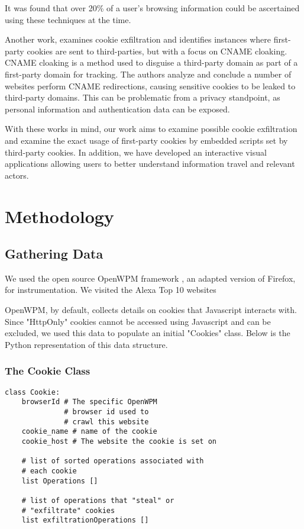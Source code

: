 \documentclass[sigplan,screen]{acmart}
\begin{document}
It was found that over 20\% of a user's browsing information could be ascertained using these techniques at the time. 

Another work, \cite{ren2021analysis} examines cookie exfiltration and identifies instances where first-party cookies are sent to third-parties, but with a focus on CNAME cloaking. CNAME cloaking is a method used to disguise a third-party domain as part of a first-party domain for tracking. The authors analyze and conclude a number of websites perform CNAME redirections, causing sensitive cookies to be leaked to third-party domains. This can be problematic from a privacy standpoint, as personal information and authentication data can be exposed. 

With these works in mind, our work aims to examine possible cookie exfiltration and examine the exact usage of first-party cookies by embedded scripts set by third-party cookies. In addition, we have developed an interactive visual applications allowing users to better understand information travel and relevant actors.

\section{Methodology}


\subsection{Gathering Data}

We used the open source OpenWPM framework \cite{englehardt2016census}, an adapted version of Firefox, for instrumentation. We visited the Alexa Top 10 websites \cite{alexa}

OpenWPM, by default, collects details on cookies that Javascript interacts with. Since "HttpOnly" cookies cannot be accessed using Javascript and can be excluded, we used this data  to populate an initial "Cookies" class.
Below is the Python representation of this data structure.

\subsubsection{The Cookie Class}

\begin{verbatim}
class Cookie: 
    browserId # The specific OpenWPM 
              # browser id used to 
              # crawl this website
    cookie_name # name of the cookie
    cookie_host # The website the cookie is set on
    
    # list of sorted operations associated with 
    # each cookie
    list Operations []
    
    # list of operations that "steal" or 
    # "exfiltrate" cookies
    list exfiltrationOperations []
    
\end{verbatim}
\end{document}
